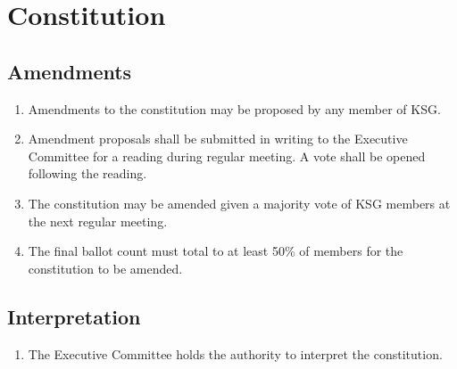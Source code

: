 \documentclass[12pt,executivepaper]{article}
\begin{document}
\section{Constitution}

\subsection{Amendments}
\begin{enumerate}
    \item Amendments to the constitution may be proposed by any member of KSG.
    \item Amendment proposals shall be submitted in writing to the Executive
          Committee for a reading during regular meeting. A vote shall be
          opened following the reading.
    \item The constitution may be amended given a majority vote of KSG members
          at the next regular meeting.
    \item The final ballot count must total to at least 50\% of members for the
          constitution to be amended.
\end{enumerate}

\subsection{Interpretation}
\begin{enumerate}
    \item The Executive Committee holds the authority to interpret the constitution.
\end{enumerate}
\end{document}
